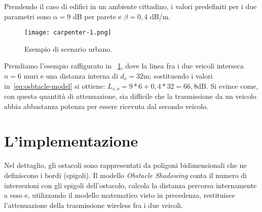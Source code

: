 Prendendo il caso di edifici in un ambiente cittadino, i valori predefiniti per i due parametri sono $\alpha = 9$ dB per parete e $\beta = 0,4$ dB/m.
%
\begin{figure}[htbp]
	\centering
		\texttt{[image: carpenter-1.png]}
\caption{Esempio di scenario urbano.\label{fig:scenario-urbano-1}}
\end{figure}
%
Prendiamo l'esempio raffigurato in \figurename~\ref{fig:scenario-urbano-1}, dove la linea fra i due veicoli interseca $n=6$ muri e una distanza interna di $d_o=32$m;
sostituendo i valori in~\ref{eq:osbtacle-model} si ottiene: $L_{s,o} = 9*6 + 0,4*32 = 66,8$dB.
Si evince come, con questa quantità di attenuazione, sia difficile che la trasmissione da un veicolo abbia abbastanza potenza per essere ricevuta dal secondo veicolo.
%
\section{L'implementazione}\label{sec:implementazione}
Nel dettaglio, gli ostacoli sono rappresentati da poligoni bidimensionali che ne definiscono i bordi (spigoli).
Il modello \textit{Obstacle Shadowing} conta il numero di intersezioni con gli spigoli dell'ostacolo, calcola la distanza percorsa internamente a esso e, utilizzando
il modello matematico visto in precedenza, restituisce l'attenuazione della trasmissione wireless fra i due veicoli.

